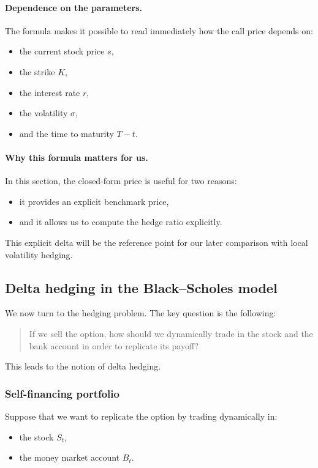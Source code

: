 \documentclass[11pt]{article}
\theoremstyle{plain}
\theoremstyle{definition}
\theoremstyle{remark}
\begin{document}
\paragraph{Dependence on the parameters.}
The formula makes it possible to read immediately how the call price
depends on:
\begin{itemize}[leftmargin=1.4em]
    \item the current stock price \(s\),
    \item the strike \(K\),
    \item the interest rate \(r\),
    \item the volatility \(\sigma\),
    \item and the time to maturity \(T-t\).
\end{itemize}

\paragraph{Why this formula matters for us.}
In this section, the closed-form price is useful for two reasons:
\begin{itemize}[leftmargin=1.4em]
    \item it provides an explicit benchmark price,
    \item and it allows us to compute the hedge ratio explicitly.
\end{itemize}

This explicit delta will be the reference point for our later
comparison with local volatility hedging.

\subsection{Delta hedging in the Black--Scholes model}

We now turn to the hedging problem.
The key question is the following:

\begin{quote}
If we sell the option, how should we dynamically trade in the stock and
the bank account in order to replicate its payoff?
\end{quote}

This leads to the notion of delta hedging.

\subsubsection{Self-financing portfolio}

Suppose that we want to replicate the option by trading dynamically in:
\begin{itemize}[leftmargin=1.4em]
    \item the stock \(S_t\),
    \item the money market account \(B_t\).
\end{itemize}
\end{document}
